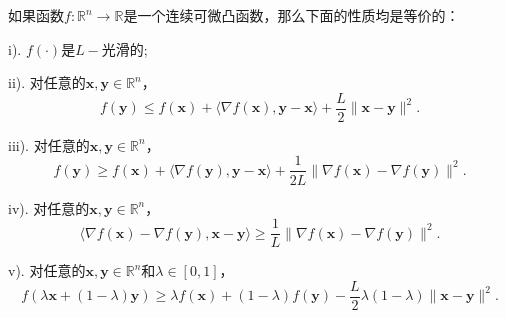 \begin{theorem}[$L-$光滑的多种刻画性质]
    如果函数$f: \mathbb{R}^{n} \rightarrow \mathbb{R}$是一个连续可微凸函数，那么下面的性质均是等价的：
\par     i). $f(\cdot)$是$L -$光滑的; 
\par    ii). 对任意的$\bm{x}, \bm{y} \in \mathbb{R}^{n}$，
    \begin{equation}
        f(\bm{y}) \leq f(\bm{x})+\langle\nabla f(\bm{x}), \bm{y}-\bm{x}\rangle+\frac{L}{2}\|\bm{x}-\bm{y}\|^{2} .
        \nonumber
    \end{equation} 
\par    iii). 对任意的$\bm{x}, \bm{y} \in \mathbb{R}^{n}$，
    \begin{equation}
        f(\bm{y}) \geq f(\bm{x})+\langle\nabla f(\bm{y}), \bm{y}-\bm{x}\rangle+\frac{1}{2 L}\|\nabla f(\bm{x})-\nabla f(\bm{y})\|^{2} .
        \nonumber
    \end{equation}
\par    iv). 对任意的$\bm{x}, \bm{y} \in \mathbb{R}^{n}$，
    \begin{equation}
        \langle\nabla f(\bm{x})-\nabla f(\bm{y}), \bm{x}-\bm{y}\rangle \geq \frac{1}{L}\|\nabla f(\bm{x})-\nabla f(\bm{y})\|^{2} .
        \nonumber
    \end{equation}
\par     v). 对任意的$\bm{x}, \bm{y} \in \mathbb{R}^{n}$和$\lambda \in[0,1]$，
    \begin{equation}
        f(\lambda \bm{x}+(1-\lambda) \bm{y}) \geq \lambda f(\bm{x})+(1-\lambda) f(\bm{y})-\frac{L}{2} \lambda(1-\lambda)\|\bm{x}-\bm{y}\|^{2} .
        \nonumber
    \end{equation}
    \label{thm1_1}
\end{theorem}
